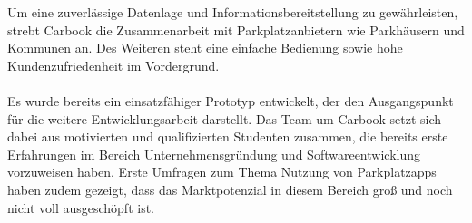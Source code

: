 \documentclass[12pt,ngerman, fleqn]{book} %
\begin{document}
Um eine zuverlässige Datenlage und Informationsbereitstellung zu gewährleisten, strebt Carbook die Zusammenarbeit mit Parkplatzanbietern wie Parkhäusern und Kommunen an. Des Weiteren steht eine einfache Bedienung sowie hohe Kundenzufriedenheit im Vordergrund.\\ \\
Es wurde bereits ein einsatzfähiger Prototyp entwickelt, der den Ausgangspunkt für die weitere Entwicklungsarbeit darstellt. Das Team um Carbook setzt sich dabei aus motivierten und qualifizierten Studenten zusammen, die bereits erste Erfahrungen im Bereich Unternehmensgründung und Softwareentwicklung vorzuweisen haben. Erste Umfragen zum Thema Nutzung von Parkplatzapps haben zudem gezeigt, dass das Marktpotenzial in diesem Bereich groß und noch nicht voll ausgeschöpft ist.\\ \\



\end{document}
